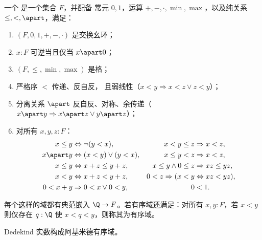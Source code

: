 \begin{defn} \label{ordered-field} 一个
  是一个集合 $F$，并配备
  常元 $0,1$，运算 $+, -, \cdot, \min, \max$，以及纯关系
  $\leq, <, \apart$，满足：
  \begin{enumerate}
  \item $(F, 0, 1, {+}, {-}, {\cdot})$ 是交换幺环；
  \item $x : F$ 可逆当且仅当 $x \apart 0$；
  \item $(F, {\leq}, {\min}, {\max})$ 是格；
  \item 严格序 $<$ 传递、反自反，
    且弱线性（$x < y \Rightarrow x < z \lor z < y$）；
  \item 分离关系 $\apart$ 反自反、对称、余传递（$x \apart y \Rightarrow x \apart z \lor y \apart z$）；
  \item 对所有 $x, y, z : F$：
    \begin{align*}
      x \leq y &\Leftrightarrow \lnot (y < x), &
      x < y \leq z &\Rightarrow x < z, \\
      x \apart y &\Leftrightarrow (x < y) \lor (y < x), &
      x \leq y < z &\Rightarrow x < z, \\
      x \leq y &\Leftrightarrow x + z \leq y + z, &
      x \leq y \land 0 \leq z &\Rightarrow x z \leq y z, \\
      x < y &\Leftrightarrow x + z < y + z, &
      0 < z \Rightarrow (x < y &\Leftrightarrow x z < y z), \\
      0 < x + y &\Rightarrow 0 < x \lor 0 < y, &
      0 &< 1.
    \end{align*}
  \end{enumerate}
  每个这样的域都有典范嵌入 $\Q \to F$。若有序域还满足：对所有 $x, y : F$，若 $x < y$ 则仅存在 $q :
  \Q$ 使 $x < q < y$，则称其为有序域。
\end{defn}

\begin{thm} \label{RD-archimedean-ordered-field}
  Dedekind 实数构成阿基米德有序域。
\end{thm}

